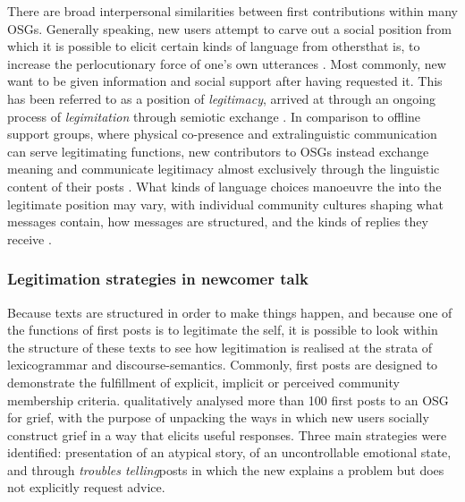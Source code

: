 There are broad interpersonal similarities between first contributions within many \glspl{OSG}. Generally speaking, new users attempt to carve out a social position from which it is possible to elicit certain kinds of language from others\textemdash{}that is, to increase the perlocutionary force of one's own utterances \cite{austin_how_1975,roberts_communicative_1996}. Most commonly, new  want to be given information and social support after having requested it. This has been referred to as a position of \emph{legitimacy}, arrived at through an ongoing process of \emph{legimitation} through semiotic exchange \cite{davies_communities_2005,smithson_developing_2012,van_leeuwen_legitimation_2007}. In comparison to offline support groups, where physical co\hyp{}presence and extralinguistic communication can serve legitimating functions, new contributors to \glspl{OSG} instead exchange meaning and communicate legitimacy almost exclusively through the linguistic content of their \glspl{post} \cite{galegher_legitimacy_1998}. What kinds of language choices manoeuvre the  into the legitimate position may vary, with individual community cultures shaping what messages contain, how messages are structured, and the kinds of replies they receive \cite{gallagher_what_2015}.

\subsubsection{Legitimation strategies in newcomer talk}

Because texts are structured in order to make things happen, and because one of the functions of first \glspl{post} is to legitimate the self, it is possible to look within the structure of these texts to see how legitimation is realised at the strata of \gls{lexicogrammar} and \glspl{discourse-semantic}. Commonly, first \glspl{post} are designed to demonstrate the fulfillment of explicit, implicit or perceived community membership criteria. \textcite{varga2014grieving} qualitatively analysed more than 100 first \glspl{post} to an \gls{OSG} for grief, with the purpose of unpacking the ways in which new users socially construct grief in a way that elicits useful responses. Three main strategies were identified: presentation of an atypical story, of an uncontrollable emotional state, and through \emph{troubles telling}\textemdash{}\glspl{post} in which the new  explains a problem but does not explicitly request advice. 


